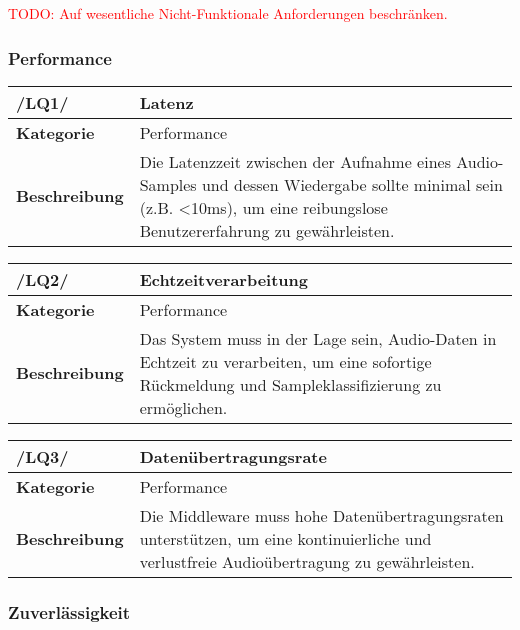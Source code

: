 \textcolor{red}{TODO: Auf wesentliche Nicht-Funktionale Anforderungen beschränken.}

\subsubsection{Performance}

\begin{table}[h!]
\begin{tabularx}{13cm}{|l|X|}
\hline
\textbf{/LQ1/} & \textbf{Latenz} \\ \hline
\textbf{Kategorie} & Performance \\ \hline
\textbf{Beschreibung} & Die Latenzzeit zwischen der Aufnahme eines Audio-Samples und dessen Wiedergabe sollte minimal sein (z.B. <10ms), um eine reibungslose Benutzererfahrung zu gewährleisten. \\ \hline
\end{tabularx}
\end{table}

\begin{table}[h!]
\begin{tabularx}{13cm}{|l|X|}
\hline
\textbf{/LQ2/} & \textbf{Echtzeitverarbeitung} \\ \hline
\textbf{Kategorie} & Performance \\ \hline
\textbf{Beschreibung} & Das System muss in der Lage sein, Audio-Daten in Echtzeit zu verarbeiten, um eine sofortige Rückmeldung und Sampleklassifizierung zu ermöglichen. \\ \hline
\end{tabularx}
\end{table}

\begin{table}[h!]
\begin{tabularx}{13cm}{|l|X|}
\hline
\textbf{/LQ3/} & \textbf{Datenübertragungsrate} \\ \hline
\textbf{Kategorie} & Performance \\ \hline
\textbf{Beschreibung} & Die Middleware muss hohe Datenübertragungsraten unterstützen, um eine kontinuierliche und verlustfreie Audioübertragung zu gewährleisten. \\ \hline
\end{tabularx}
\end{table}

\subsubsection{Zuverlässigkeit}

